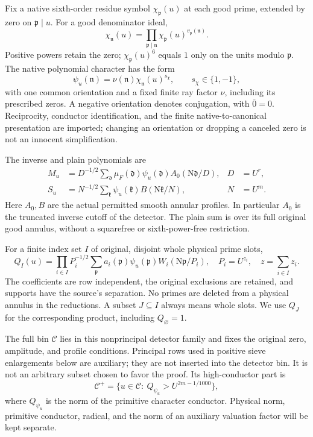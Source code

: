 \documentclass[11pt]{article}
\theoremstyle{definition}
\newcommand{\N}{\mathrm N}
\newcommand{\Cplus}{\mathcal C^+}
\begin{document}
Fix a native sixth-order residue symbol $\chi_{\mathfrak p}(u)$ at each good prime, extended by zero on $\mathfrak p\mid u$. For a good denominator ideal,
\begin{equation}\label{eq-symbol-multiplicative}
 \chi_{\mathfrak n}(u)=\prod_{\mathfrak p\mid\mathfrak n}
 \chi_{\mathfrak p}(u)^{v_{\mathfrak p}(\mathfrak n)}.
\end{equation}
Positive powers retain the zero; $\chi_{\mathfrak p}(u)^6$ equals $1$ only on the units modulo $\mathfrak p$. The native polynomial character has the form
\[
 \psi_u(\mathfrak n)=\nu(\mathfrak n)\chi_{\mathfrak n}(u)^{s_\chi},
 \qquad s_\chi\in\{1,-1\},
\]
with one common orientation and a fixed finite ray factor $\nu$, including its prescribed zeros. A negative orientation denotes conjugation, with $\overline0=0$. Reciprocity, conductor identification, and the finite native-to-canonical presentation are imported; changing an orientation or dropping a canceled zero is not an innocent simplification.

The inverse and plain polynomials are
\begin{align}\label{eq-polynomials}
 M_u&=D^{-1/2}\sum_{\mathfrak d}\mu_F(\mathfrak d)
 \psi_u(\mathfrak d)A_0(\N\mathfrak d/D),&D&=U^r,\\
 S_u&=N^{-1/2}\sum_{\mathfrak k}\psi_u(\mathfrak k)
 B(\N\mathfrak k/N),&N&=U^m.
\end{align}
Here $A_0,B$ are the actual permitted smooth annular profiles. In particular $A_0$ is the truncated inverse cutoff of the detector. The plain sum is over its full original good annulus, without a squarefree or sixth-power-free restriction.

For a finite index set $I$ of original, disjoint whole physical prime slots,
\[
 Q_I(u)=\prod_{i\in I}P_i^{-1/2}
 \sum_{\mathfrak p}a_i(\mathfrak p)\psi_u(\mathfrak p)
 W_i(\N\mathfrak p/P_i),\quad P_i=U^{z_i},\quad z=\sum_{i\in I}z_i.
\]
The coefficients are row independent, the original exclusions are retained, and supports have the source's separation. No primes are deleted from a physical annulus in the reductions. A subset $J\subseteq I$ always means whole slots. We use $Q_J$ for the corresponding product, including $Q_\varnothing=1$.

The full bin $\mathcal C$ lies in this nonprincipal detector family and fixes the original zero, amplitude, and profile conditions. Principal rows used in positive sieve enlargements below are auxiliary; they are not inserted into the detector bin. It is not an arbitrary subset chosen to favor the proof. Its high-conductor part is
\begin{equation}\label{eq-cplus}
 \Cplus=\{u\in\mathcal C:\ Q_{\psi_u}>U^{2m-1/1000}\},
\end{equation}
where $Q_{\psi_u}$ is the norm of the primitive character conductor. Physical norm, primitive conductor, radical, and the norm of an auxiliary valuation factor will be kept separate.
\end{document}
